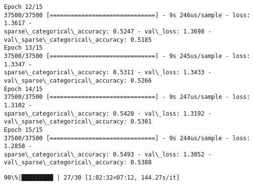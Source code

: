 \documentclass[11pt]{article}
\begin{document}
\begin{Verbatim}[commandchars=\\\{\}]
Epoch 12/15
37500/37500 [==============================] - 9s 246us/sample - loss: 1.3617 -
sparse\_categorical\_accuracy: 0.5247 - val\_loss: 1.3698 -
val\_sparse\_categorical\_accuracy: 0.5185
Epoch 13/15
37500/37500 [==============================] - 9s 245us/sample - loss: 1.3347 -
sparse\_categorical\_accuracy: 0.5311 - val\_loss: 1.3433 -
val\_sparse\_categorical\_accuracy: 0.5266
Epoch 14/15
37500/37500 [==============================] - 9s 247us/sample - loss: 1.3102 -
sparse\_categorical\_accuracy: 0.5420 - val\_loss: 1.3192 -
val\_sparse\_categorical\_accuracy: 0.5301
Epoch 15/15
37500/37500 [==============================] - 9s 244us/sample - loss: 1.2858 -
sparse\_categorical\_accuracy: 0.5493 - val\_loss: 1.3052 -
val\_sparse\_categorical\_accuracy: 0.5388
    \end{Verbatim}

    \begin{Verbatim}[commandchars=\\\{\}]
 90\%|█████████ | 27/30 [1:02:32<07:12, 144.27s/it]
    \end{Verbatim}
\end{document}

